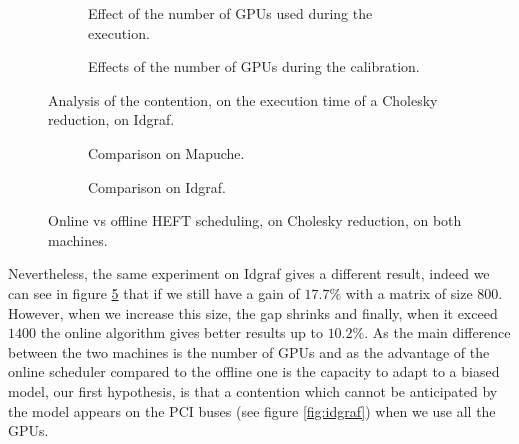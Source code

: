 \documentclass[10pt, conference, compsocconf,pdftex,dvipsnames]{IEEEtran}
\begin{document}
\begin{figure}[htb]
        \addtocounter{figure}{1}
        \centering
        \begin{subfigure}{0.5\textwidth}
        \scalebox{0.6}{
            
        }
        \caption{Effect of the number of GPUs used during the execution.}
        \label{fig:ContentionGpu}
    \end{subfigure}
    \begin{subfigure}{0.5\textwidth}
        \scalebox{0.6}{
            \centering
            
        }
        \caption{Effects of the number of GPUs during the calibration.}
        \label{fig:ContentionTrick}
    \end{subfigure}
    \label{fig:Contention}
    \caption{Analysis of the contention, on the execution time of a 
    Cholesky reduction, on Idgraf.}

\end{figure}

\begin{figure}[bt]
    \addtocounter{figure}{-2}
    \centering
    \begin{subfigure}{0.4\textwidth}
        \hspace{-20pt}
        \scalebox{0.7}{
            
        }
        \caption{Comparison on Mapuche.}
        \label{fig:OnOffMapuche}
    \end{subfigure}
    \hspace{15pt}
    \begin{subfigure}{0.55\textwidth}
        \scalebox{0.7}{
            
        }
        \caption{Comparison on Idgraf.}
        \label{fig:OnOffIdgraf}
    \end{subfigure}
    \caption{Online vs offline HEFT scheduling, on Cholesky reduction, on both
    machines.}
    \label{fig:OnOff}
\end{figure}
\addtocounter{figure}{1}


Nevertheless, the same experiment on Idgraf gives a different result, indeed
we can see in figure \ref{fig:OnOffIdgraf} that if we still have a gain of
$17.7\%$ with a matrix of size $800$. However, when we increase this size, the
gap shrinks and finally, when it exceed $1400$ the online algorithm gives
better results up to $10.2\%$. As the main difference between the two machines
is the number of GPUs and as the advantage of the online scheduler compared to
the offline one is the capacity to adapt to a biased model, our first
hypothesis, is that a contention which cannot be anticipated by the model
appears on the PCI buses (see figure \ref{fig:idgraf}) when we use all the
GPUs. 
\end{document}
